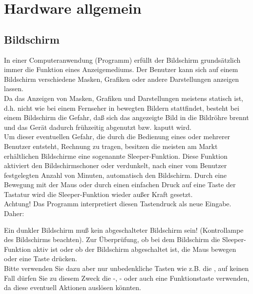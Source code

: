 \cleardoublepage

\chapter{Hardware allgemein}

\cleardoublepage

\section{Bildschirm}

In einer Computeranwendung (Programm) erf\"{u}llt der Bildschirm
grunds\"{a}tzlich immer die Funktion eines Anzeigemediums. Der Benutzer
kann sich auf einem Bildschirm verschiedene Masken, Grafiken oder
andere Darstellungen anzeigen lassen.\\

Da das Anzeigen von Masken, Grafiken und Darstellungen meistens statisch ist, d.h. nicht wie bei einem Fernseher in bewegten Bildern stattfindet,
besteht bei einem Bildschirm die Gefahr, da{\ss} sich das angezeigte Bild
in die Bildr\"{o}hre brennt und das Ger\"{a}t dadurch fr\"{u}hzeitig
abgenutzt bzw. kaputt wird. \\

Um dieser eventuellen Gefahr, die durch die Bedienung eines oder
mehrerer Benutzer entsteht, Rechnung zu tragen, besitzen die meisten
am Markt erh\"{a}ltlichen Bildschirme eine sogenannte Sleeper-Funktion.
Diese Funktion aktiviert den Bildschirmschoner oder verdunkelt, nach
einer vom Benutzer festgelegten Anzahl von Minuten, automatisch den
Bildschirm. Durch eine Bewegung mit der Maus oder durch einen einfachen Druck
auf eine Taste der Tastatur wird die Sleeper-Funktion wieder au{\ss}er Kraft gesetzt.\\
Achtung! Das Programm interpretiert diesen Tastendruck als neue Eingabe.
Daher:

\vspace{0.5cm}
\begin{bf}
\begin{it}
Ein dunkler Bildschirm mu{\ss} kein abgeschalteter Bildschirm sein!
(Kontrollampe des Bildschirms beachten). Zur \"{U}berpr\"{u}fung,
ob bei dem Bildschirm die Sleeper-Funktion aktiv ist oder ob der
Bildschirm abgeschaltet ist, die Maus bewegen oder eine Taste dr\"{u}cken.\\
Bitte verwenden Sie dazu aber nur unbedenkliche Tasten wie z.B.
die , auf keinen Fall d\"{u}rfen Sie
zu diesem Zweck die -, - oder auch eine
Funktionstaste verwenden, da diese eventuell Aktionen ausl\"{o}sen k\"{o}nnten.
\end{it}
\end{bf}
\vspace{0.5cm}

